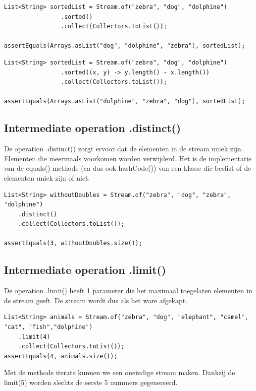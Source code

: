 \begin{lstlisting}
List<String> sortedList = Stream.of("zebra", "dog", "dolphine")
				.sorted()
				.collect(Collectors.toList());

assertEquals(Arrays.asList("dog", "dolphine", "zebra"), sortedList);
\end{lstlisting}

\begin{lstlisting}
List<String> sortedList = Stream.of("zebra", "dog", "dolphine")
				.sorted((x, y) -> y.length() - x.length())
				.collect(Collectors.toList());
		
assertEquals(Arrays.asList("dolphine", "zebra", "dog"), sortedList);
\end{lstlisting}

\subsection{Intermediate operation .distinct()}

De operation .distinct() zorgt ervoor dat de elementen in de stream uniek zijn. Elementen die meermaals voorkomen worden verwijderd. Het is de implementatie van de equals() methode (en dus ook hashCode()) van een klasse die beslist of de elementen uniek zijn of niet.

\begin{lstlisting}
List<String> withoutDoubles = Stream.of("zebra", "dog", "zebra", "dolphine")
    .distinct()
    .collect(Collectors.toList());
    
assertEquals(3, withoutDoubles.size());
\end{lstlisting}

\subsection{Intermediate operation .limit()}

De operation .limit() heeft 1 parameter die het maximaal toegelaten elementen in de stream geeft.
De stream wordt dus als het ware afgekapt.

\begin{lstlisting}
List<String> animals = Stream.of("zebra", "dog", "elephant", "camel", "cat", "fish","dolphine")
    .limit(4)
    .collect(Collectors.toList());
assertEquals(4, animals.size());
\end{lstlisting}

Met de methode iterate kunnen we een oneindige stream maken. Dankzij de limit(5) worden slechts de eerste 5 nummers gegenereerd.

